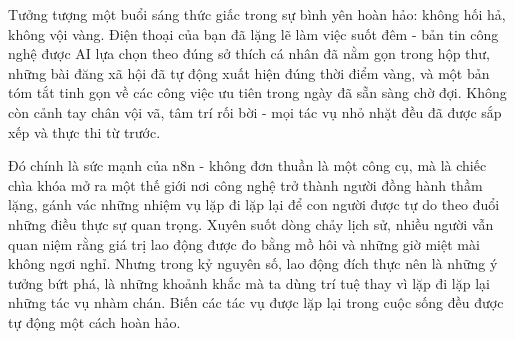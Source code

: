 \documentclass[a4paper,12pt,oneside]{book}
\begin{document}
\begin{center}
\end{center}


Tưởng tượng một buổi sáng thức giấc trong sự bình yên hoàn hảo: không hối hả, không vội vàng. Điện thoại của bạn đã lặng lẽ làm việc suốt đêm - bản tin công nghệ được AI lựa chọn theo đúng sở thích cá nhân đã nằm gọn trong hộp thư, những bài đăng xã hội đã tự động xuất hiện đúng thời điểm vàng, và một bản tóm tắt tinh gọn về các công việc ưu tiên trong ngày đã sẵn sàng chờ đợi. Không còn cảnh tay chân vội vã, tâm trí rối bời - mọi tác vụ nhỏ nhặt đều đã được sắp xếp và thực thi từ trước.

Đó chính là sức mạnh của n8n - không đơn thuần là một công cụ, mà là chiếc chìa khóa mở ra một thế giới nơi công nghệ trở thành người đồng hành thầm lặng, gánh vác những nhiệm vụ lặp đi lặp lại để con người được tự do theo đuổi những điều thực sự quan trọng. Xuyên suốt dòng chảy lịch sử, nhiều người vẫn quan niệm rằng giá trị lao động được đo bằng mồ hôi và những giờ miệt mài không ngơi nghỉ. 
Nhưng trong kỷ nguyên số, lao động đích thực nên là những ý tưởng bứt phá, là những khoảnh khắc mà ta dùng trí tuệ thay vì lặp đi lặp lại những tác vụ nhàm chán. Biến các tác vụ được lặp lại trong cuộc sống đều được tự động một cách hoàn hảo.
\end{document}
